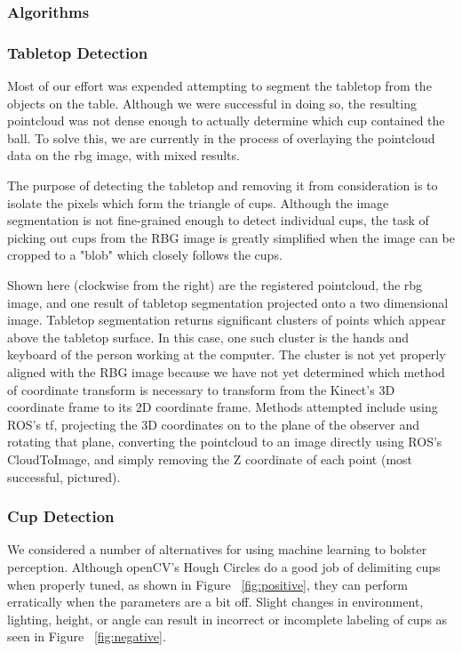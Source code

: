 \documentclass[letterpaper, 10 pt, conference]{ieeeconf}  %
\begin{document}
\subsubsection{Algorithms}

\subsubsection{Tabletop Detection}

Most of our effort was expended attempting to segment the tabletop from the objects on the table.  Although we were successful in doing so, the resulting pointcloud was not dense enough to actually determine which cup contained the ball.  To solve this, we are currently in the process of overlaying the pointcloud data on the rbg image, with mixed results.

The purpose of detecting the tabletop and removing it from consideration is to isolate the pixels which form the triangle of cups.  Although the image segmentation is not fine-grained enough to detect individual cups, the task of picking out cups from the RBG image is greatly simplified when the image can be cropped to a "blob" which closely follows the cups.


Shown here (clockwise from the right) are the registered pointcloud, the rbg image, and one result of tabletop segmentation projected onto a two dimensional image.  Tabletop segmentation returns significant clusters of points which appear above the tabletop surface.  In this case, one such cluster is the hands and keyboard of the person working at the computer.  The cluster is not yet properly aligned with the RBG image because we have not yet determined which method of coordinate transform is necessary to transform from the Kinect's 3D coordinate frame to its 2D coordinate frame.  Methods attempted include using ROS's tf, projecting the 3D coordinates on to the plane of the observer and rotating that plane, converting the pointcloud to an image directly using ROS's CloudToImage, and simply removing the Z coordinate of each point (most successful, pictured).


\subsubsection{Cup Detection}

We considered a number of alternatives for using machine learning to bolster perception.  Although openCV’s Hough Circles do a good job of delimiting cups when properly tuned, as shown in Figure ~\ref{fig:positive}, they can perform erratically when the parameters are a bit off.  Slight changes in environment, lighting, height, or angle can result in incorrect or incomplete labeling of cups as seen in Figure ~\ref{fig:negative}.
\end{document}
